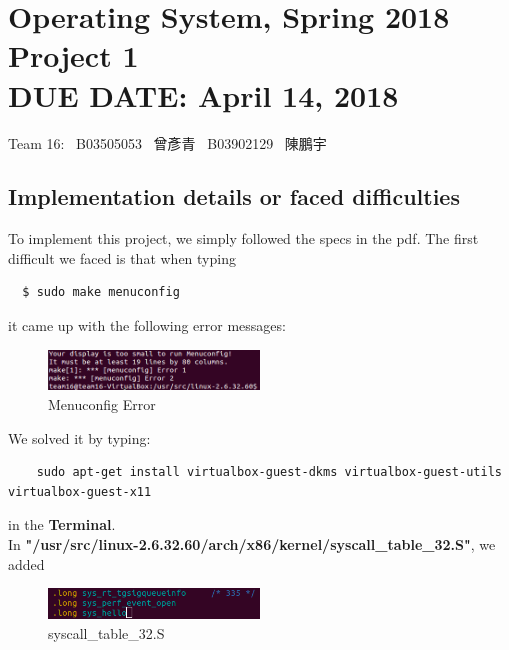\documentclass{article}
\newcommand{\hmwkClass}{Operating System, Spring 2018}
\newcommand{\hmwkTitle}{Project 1}
\newcommand{\hmwkDueDate}{April 14, 2018}
\newcommand{\tb}{\textbf}
\begin{document}
\thispagestyle{empty}
\section*{\hmwkClass \\
    \normalsize{\hmwkTitle} \\
    \normalsize{DUE DATE: \hmwkDueDate}
}

\hfill{Team 16: \, B03505053 \, 曾彥青 \, B03902129 \, 陳鵬宇} \\

\subsection*{Implementation details or faced difficulties}

To implement this project, we simply followed the specs in the pdf. The first difficult we faced is that when typing

\begin{lstlisting}
  $ sudo make menuconfig
\end{lstlisting}

it came up with the following error messages:

\begin{figure}[!htb]
    \centering
    \includegraphics[width=0.5\textwidth]{img/Menuconfig.png}
    \caption{Menuconfig Error}
\end{figure}

We solved it by typing:

\begin{lstlisting}
    sudo apt-get install virtualbox-guest-dkms virtualbox-guest-utils virtualbox-guest-x11
\end{lstlisting}

in the \tb{Terminal}. \\

In \tb{"/usr/src/linux-2.6.32.60/arch/x86/kernel/syscall\_table\_32.S"}, we added

\begin{figure}[!htb]
    \centering
    \includegraphics[width=0.5\textwidth]{img/syscall_table.png}
    \caption{syscall\_table\_32.S}
\end{figure}
\end{document}
